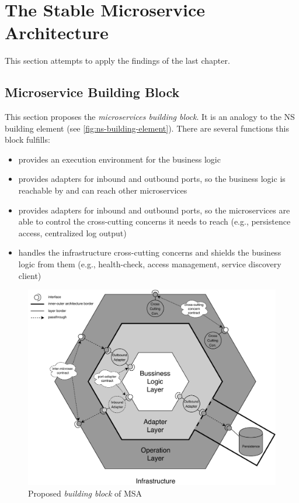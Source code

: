 \documentclass[thesis=M,english,hidelinks]{FITthesis}[2012/10/20]
\begin{document}
\chapter{The Stable Microservice Architecture}
\label{sec:guidelines}

This section attempts to apply the findings of the last chapter. 

\section{Microservice Building Block}
This section proposes the \textit{microservices building block}. It is an analogy to the \acrshort{NS} building element (see \ref{fig:ns-building-element}). There are several functions this block fulfills:
\begin{itemize}
    \item provides an execution environment for the business logic
    \item provides adapters for inbound and outbound ports, so the business logic is reachable by and can reach other microservices 
    \item provides adapters for inbound and outbound ports, so the microservices are able to control the cross-cutting concerns it needs to reach (e.g., persistence access, centralized log output)
    \item handles the infrastructure cross-cutting concerns and shields the business logic from them (e.g., health-check, access management, service discovery client)
\end{itemize}

\begin{figure}
  \centering
    \includegraphics[width=1\textwidth]{images/proposed-ms-architecture-db.pdf}
    \caption{Proposed \textit{building block} of \acrshort{MSA}}
    \label{fig:proposed-building-block}
\end{figure}
\end{document}
